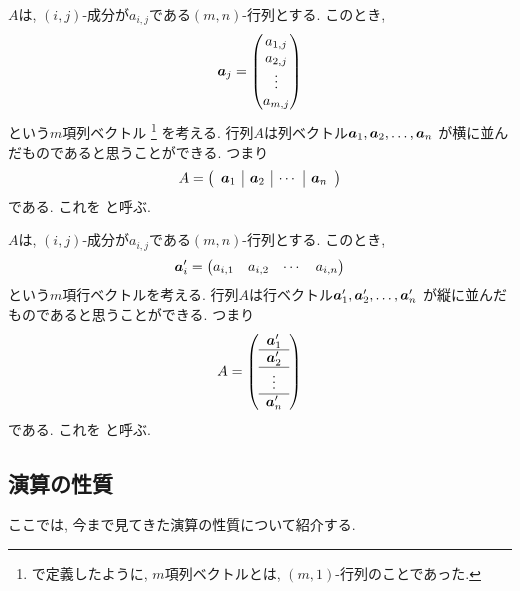 \begin{remark}
  $A$は, $(i,j)$-成分が$a_{i,j}$である$(m,n)$-行列とする.
  このとき,
  \begin{align*}
    \boldsymbol{a}_j=\begin{pmatrix}a_{1,j}\\a_{2,j}\\\vdots\\a_{m,j}\end{pmatrix}
  \end{align*}
  という$m$項列ベクトル%
  \footnote{で定義したように,
  $m$項列ベクトルとは, $(m,1)$-行列のことであった.}
  を考える.
  行列$A$は列ベクトル$\boldsymbol{a}_{1},\boldsymbol{a}_2,\ldots,\boldsymbol{a}_{n}$
  が横に並んだものであると思うことができる.
  つまり
  \begin{align*}
    A=\left(\begin{array}{c|c|c|c}\boldsymbol{a}_{1}&\boldsymbol{a}_2&\cdots&\boldsymbol{a}_{n}\end{array}\right)
  \end{align*}
  である.
  これを
  と呼ぶ.
\end{remark}

\begin{remark}
  $A$は, $(i,j)$-成分が$a_{i,j}$である$(m,n)$-行列とする.
  このとき,
  \begin{align*}
    \boldsymbol{a}'_i=\begin{pmatrix}a_{i,1}&a_{i,2}&\cdots&a_{i,n}\end{pmatrix}
  \end{align*}
  という$m$項行ベクトルを考える.
  行列$A$は行ベクトル$\boldsymbol{a}'_{1},\boldsymbol{a}'_2,\ldots,\boldsymbol{a}'_{n}$
  が縦に並んだものであると思うことができる.
  つまり
  \begin{align*}
    A=\left(\begin{array}{c}\boldsymbol{a}'_{1}\\\hline\boldsymbol{a}'_2\\\hline\vdots\\\hline\boldsymbol{a}'_{n}\end{array}\right)
  \end{align*}
  である.
  これを
   と呼ぶ.
\end{remark}



\subsection{演算の性質}
ここでは, 今まで見てきた演算の性質について紹介する.


